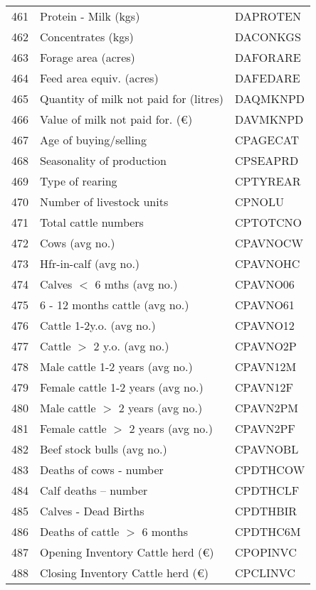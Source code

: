 \documentclass{article}\usepackage{graphicx, color}
\begin{document}
\begin{flushleft}
\begin{table}[ht]
\begin{center}
\begin{tabular}{rll}
  461 & Protein - Milk             (kgs) & DAPROTEN \\ 
  462 & Concentrates               (kgs) & DACONKGS \\ 
  463 & Forage area                (acres) & DAFORARE \\ 
  464 & Feed area equiv.           (acres) & DAFEDARE \\ 
  465 & Quantity of milk not paid for  (litres) & DAQMKNPD \\ 
  466 & Value of milk not paid for.    (€) & DAVMKNPD \\ 
  467 & Age of buying/selling & CPAGECAT \\ 
  468 & Seasonality of production & CPSEAPRD \\ 
  469 & Type of rearing & CPTYREAR \\ 
  470 & Number of livestock units & CPNOLU \\ 
  471 & Total cattle numbers & CPTOTCNO \\ 
  472 & Cows           (avg no.) & CPAVNOCW \\ 
  473 & Hfr-in-calf    (avg no.) & CPAVNOHC \\ 
  474 & Calves $<$ 6 mths       (avg no.) & CPAVNO06 \\ 
  475 & 6 - 12 months cattle  (avg no.) & CPAVNO61 \\ 
  476 & Cattle 1-2y.o.        (avg no.) & CPAVNO12 \\ 
  477 & Cattle $>$ 2 y.o.       (avg no.) & CPAVNO2P \\ 
  478 & Male cattle 1-2 years   (avg no.) & CPAVN12M \\ 
  479 & Female cattle 1-2 years (avg no.) & CPAVN12F \\ 
  480 & Male cattle   $>$ 2 years (avg no.) & CPAVN2PM \\ 
  481 & Female cattle $>$ 2 years (avg no.) & CPAVN2PF \\ 
  482 & Beef stock bulls        (avg no.) & CPAVNOBL \\ 
  483 & Deaths of cows - number & CPDTHCOW \\ 
  484 & Calf deaths -- number & CPDTHCLF \\ 
  485 & Calves - Dead Births & CPDTHBIR \\ 
  486 & Deaths of cattle $>$ 6 months & CPDTHC6M \\ 
  487 & Opening Inventory Cattle herd (€) & CPOPINVC \\ 
  488 & Closing Inventory Cattle herd (€) & CPCLINVC \\ 

\end{tabular}
\end{center}
\end{table}
\end{flushleft}
\end{document}
